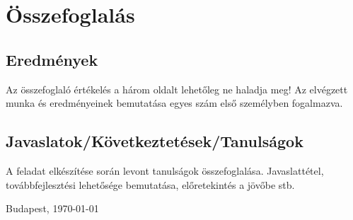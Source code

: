 \chapter{Összefoglalás} %


\section{Eredmények}
Az összefoglaló értékelés a három oldalt lehetőleg ne haladja meg! 
Az elvégzett munka és eredményeinek bemutatása egyes szám első személyben fogalmazva.


\section{Javaslatok/Következtetések/Tanulságok} %
A feladat elkészítése során levont tanulságok összefoglalása. Javaslattétel, 
továbbfejlesztési lehetősége bemutatása, előretekintés a jövőbe stb.

\vspace{0.5cm}

\begin{flushleft}
{Budapest, \today}
\end{flushleft}

\begin{flushright}
\emph{\szerzo}
\end{flushright}

\vfill